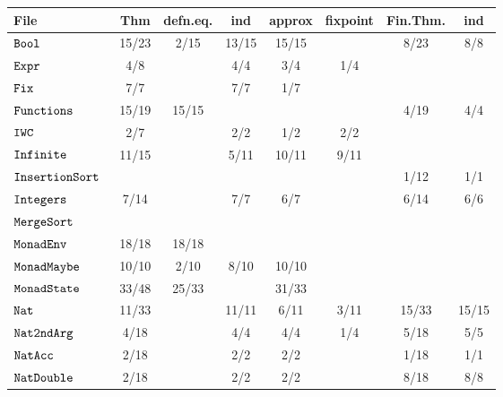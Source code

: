 %
%
%
%
\begin{tabular}{>{\footnotesize}l || >{\footnotesize}c | >{\footnotesize}c | >{\footnotesize}c | >{\footnotesize}c | >{\footnotesize}c || >{\footnotesize}c | >{\footnotesize}c}
File                       & Thm & defn.eq. & ind & approx & fixpoint & Fin.Thm. & ind \\
\hline
$\texttt{Bool                    }$   & 15/23 & 2/15 & 13/15 & 15/15 &  & 8/23 & 8/8\\
$\texttt{Expr                    }$   & 4/8 &  & 4/4 & 3/4 & 1/4 &  & \\
$\texttt{Fix                     }$   & 7/7 &  & 7/7 & 1/7 &  &  & \\
$\texttt{Functions               }$   & 15/19 & 15/15 &  &  &  & 4/19 & 4/4\\
$\texttt{IWC                     }$   & 2/7 &  & 2/2 & 1/2 & 2/2 &  & \\
$\texttt{Infinite                }$   & 11/15 &  & 5/11 & 10/11 & 9/11 &  & \\
$\texttt{InsertionSort           }$   &  &  &  &  &  & 1/12 & 1/1\\
$\texttt{Integers                }$   & 7/14 &  & 7/7 & 6/7 &  & 6/14 & 6/6\\
$\texttt{MergeSort               }$   &  &  &  &  &  &  & \\
$\texttt{MonadEnv                }$   & 18/18 & 18/18 &  &  &  &  & \\
$\texttt{MonadMaybe              }$   & 10/10 & 2/10 & 8/10 & 10/10 &  &  & \\
$\texttt{MonadState              }$   & 33/48 & 25/33 &  & 31/33 &  &  & \\
$\texttt{Nat                     }$   & 11/33 &  & 11/11 & 6/11 & 3/11 & 15/33 & 15/15\\
$\texttt{Nat2ndArg               }$   & 4/18 &  & 4/4 & 4/4 & 1/4 & 5/18 & 5/5\\
$\texttt{NatAcc                  }$   & 2/18 &  & 2/2 & 2/2 &  & 1/18 & 1/1\\
$\texttt{NatDouble               }$   & 2/18 &  & 2/2 & 2/2 &  & 8/18 & 8/8\\

\end{tabular}
